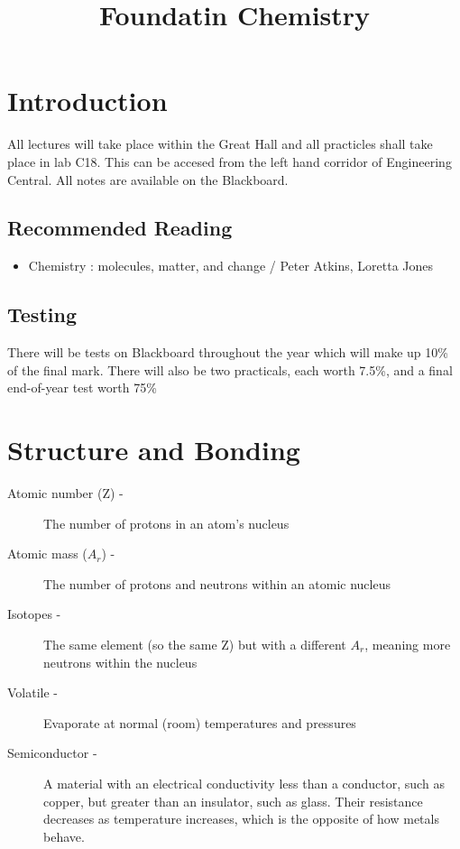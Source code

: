 \documentclass[a4paper, 12pt]{article}
\begin{document}
\title{Foundatin Chemistry}
\date{}
\maketitle 

\tableofcontents

\newpage

\section*{Introduction}
	All lectures will take place within the Great Hall and all practicles shall take place in lab C18. This can be accesed from the left hand corridor of Engineering Central. All notes are available on the Blackboard.

	\subsection{Recommended Reading}
		\begin{itemize}
			\item Chemistry : molecules, matter, and change / Peter Atkins, Loretta Jones 
		\end{itemize}
	
	\subsection{Testing}
		There will be tests on Blackboard throughout the year which will make up 10\% of the final mark. There will also be two practicals, each worth 7.5\%, and a final end-of-year test worth 75\%

\newpage

\section{Structure and Bonding}
	\begin{description} 
		\item [Atomic number (Z) - ] The number of protons in an atom's nucleus
		\item [Atomic mass ($A_r$) - ] The number of protons and neutrons within an atomic nucleus
		\item [Isotopes - ] The same element (so the same Z) but with a different $A_r$, meaning more neutrons within the nucleus
		\item [Volatile - ] Evaporate at normal (room) temperatures and pressures
		\item [Semiconductor - ] A material with an electrical conductivity less than a conductor, such as copper, but greater than an insulator, such as glass. Their resistance decreases as temperature increases, which is the opposite of how metals behave.
	\end{description}
\end{document}
